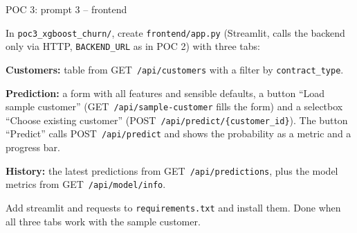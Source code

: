 \documentclass[aspectratio=169,11pt]{beamer}
\begin{document}
\begin{frame}{POC 3: prompt 3 -- frontend}
  \vspace{2pt}
  \begin{promptbox}
    In \texttt{poc3\_xgboost\_churn/}, create \texttt{frontend/app.py} (Streamlit, calls the backend only via HTTP, \texttt{BACKEND\_URL} as in POC 2) with three tabs:
    \par\smallskip
    \textbf{Customers:} table from GET~\texttt{/api/customers} with a filter by \texttt{contract\_type}.
    \par\smallskip
    \textbf{Prediction:} a form with all features and sensible defaults, a button ``Load sample customer'' (GET~\texttt{/api/sample-customer} fills the form) and a selectbox ``Choose existing customer'' (POST~\texttt{/api/predict/\{customer\_id\}}). The button ``Predict'' calls POST~\texttt{/api/predict} and shows the probability as a metric and a progress bar.
    \par\smallskip
    \textbf{History:} the latest predictions from GET~\texttt{/api/predictions}, plus the model metrics from GET~\texttt{/api/model/info}.
    \par\smallskip
    Add streamlit and requests to \texttt{requirements.txt} and install them. Done when all three tabs work with the sample customer.
  \end{promptbox}
\end{frame}
\end{document}
